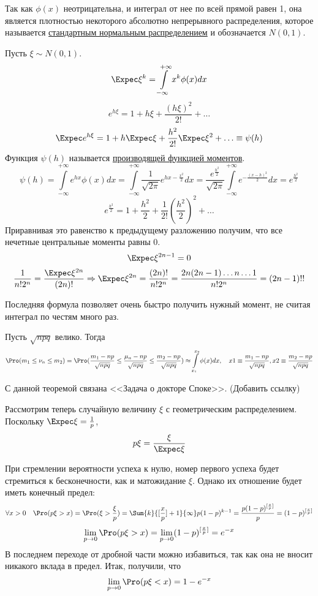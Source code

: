 Так как $\phi(x)$ неотрицательна, и интеграл от нее по всей прямой равен 1, она является плотностью некоторого абсолютно непрерывного распределения, которое называется \underline{стандартным нормальным распределением} и обозначается $N(0, 1)$.

Пусть $\xi \sim N(0,1)$.
$$\Expec\xi^k = \int\limits_{-\infty}^{+\infty}x^k\phi(x)dx$$
$$e^{h\xi}=1 + h\xi + \frac{(h\xi)^2}{2!} + \ldots$$
$$\Expec e^{h\xi} = 1 + h\Expec\xi + \frac{h^2}{2!}\Expec\xi^2 + \ldots \equiv \psi(h)$$
Функция $\psi(h)$ называется \underline{производящей функцией моментов}.
$$\psi(h) = \int\limits_{-\infty}^{+\infty}e^{hx}\phi(x)dx = \int\limits_{-\infty}^{+\infty}\frac{1}{\sqrt{2\pi}}e^{hx-\frac{x^2}2}dx = \frac{e^{\frac{h^2}2}}{\sqrt{2\pi}}\int\limits_{-\infty}^{+\infty}e^{-\frac{(x-h)^2}2}dx = e^{\frac{h^2}2}$$
$$e^{\frac{h^2}2} = 1 + \frac{h^2}2 + \frac1{2!}(\frac{h^2}2)^2 + \ldots$$
Приравнивая это равенство к предыдущему разложению получим, что все нечетные центральные моменты равны 0.
$$\Expec\xi^{2n-1} = 0$$
$$\frac{1}{n!2^n} = \frac{\Expec\xi^{2n}}{(2n)!} \Rightarrow \Expec\xi^{2n} = \frac{(2n)!}{n!2^n} = \frac{2n(2n-1)\ldots n \ldots 1}{n!2^n} = (2n-1)!!$$

Последняя формула позволяет очень быстро получить нужный момент, не считая интеграл по честям много раз.

\begin{Th}
Пусть $\sqrt{npq}$ велико. Тогда
$$\Pro(m_1 \le \nu_n \le m_2) = \Pro(\frac{m_1 - np}{\sqrt{npq}} \le \frac{\mu_n - np}{\sqrt{npq}} \le \frac{m_2 - np}{\sqrt{npq}}) \approx \int\limits_{x_1}^{x_2}\phi(x)dx, \quad x1 \equiv \frac{m_1 - np}{\sqrt{npq}}, x2 \equiv\frac{m_2 - np}{\sqrt{npq}}$$
\end{Th}

С данной теоремой связана <<Задача о докторе Споке>>. (Добавить ссылку)

Рассмотрим теперь случайную величину $\xi$ с геометрическим распределением. Поскольку $\Expec\xi = \frac1p$, 
$$p\xi=\frac{\xi}{\Expec\xi}$$

При стремлении вероятности успеха к нулю, номер первого успеха будет стремиться к бесконечности, как и матожидание $\xi$. Однако их отношение будет иметь конечный предел:
$$\forall x > 0 \quad \Pro(p\xi > x) = \Pro(\xi > \frac{\xi}p) = \Sum{k}{[\frac{x}{p}] + 1}{\infty}p(1-p)^{k-1} = \frac{p(1-p)^{[\frac{x}p]}}p = (1-p)^{[\frac{x}p]}$$ 
$$\lim\limits_{p \to 0} \Pro(p\xi > x) = \lim\limits_{p \to 0}(1-p)^{[\frac{x}p]} = e^{-x}$$
В последнем переходе от дробной части можно избавиться, так как она не вносит никакого вклада в предел.
Итак, получили, что
$$\lim\limits_{p \to 0} \Pro(p\xi < x) = 1 - e^{-x}$$

